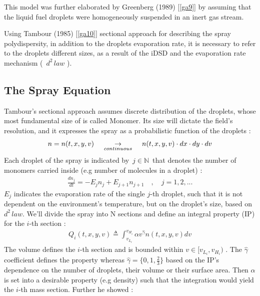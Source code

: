 \documentclass[12pt]{article}
\numberwithin{equation}{section}
\begin{document}
\begin{flushleft}
This model was further elaborated by Greenberg (1989) [\ref{ga9}] by assuming that the liquid fuel droplets were homogeneously suspended in an inert gas stream.

Using Tambour (1985) [\ref{ga10}] sectional approach for describing the spray polydispersity, in addition to the droplets evaporation rate, it is necessary to refer to the droplets different sizes, as a result of the iDSD and the evaporation rate mechanism ( \,$d^2 \, law$ ).

\newpage

\subsection{The Spray Equation}
Tambour’s sectional approach assumes discrete distribution of the droplets, whose most fundamental size of is called Monomer. Its size will dictate the field’s resolution, and it expresses the spray as a probabilistic function of the droplets :
\begin{align} \label{2_sections}
n = n(t, x, y, v) \hspace{4mm} \underset{continuous}{\rightarrow} \hspace{4mm} n(t, x, y, v) \cdot dx \cdot dy \cdot dv
\end{align}
Each droplet of the spray is indicated by\ $j \in \mathbb{N}$\ that denotes the number of monomers carried inside (e.g number of molecules in a droplet) :
\begin{align} %
\frac{d n_j}{dt} = -E_j n_j + E_{j+1} n_{j+1} \quad , \quad j =1, 2, ...
\end{align}
$E_j$ indicates the evaporation rate of the single $j$-th droplet, such that it is not dependent on the environment's temperature, but on the droplet’s size, based on $d^2\, law$. We’ll divide the spray into N sections and define an integral property (IP) for the $i$-th section :
\begin{align} \label{2_Q_i}
Q_i(t, x, y, v) \triangleq \int_{v_{L_i}}^{v_{H_i}} \alpha v^{\hat{\gamma}} n(t, x, y, v) dv
\end{align}
The volume defines the $i$-th section and is bounded within $v \in [v_{L_i} , v_{H_i} )$ . The $\hat{\gamma}$ coefficient defines the property whereas $\hat{\gamma} = \{0 , 1 , \frac{2}{3} \}$ based on the IP’s dependence on the number of droplets, their volume or their surface area. Then $\alpha$ is set into a desirable property (e.g density) such that the integration would yield the $i$-th mass section. Further he showed :

\end{flushleft}
\end{document}
